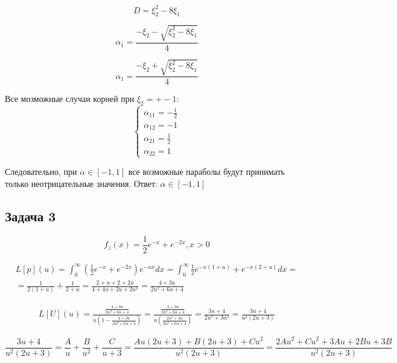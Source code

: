 \documentclass[a4paper,12pt]{article}
\begin{document}
\[ D = \xi_2^2 - 8\xi_1 \]

\[ \alpha_1 = \frac{-\xi_2 - \sqrt{\xi_2^2 - 8\xi_1}}{4} \]

\[ \alpha_1 = \frac{-\xi_2 + \sqrt{\xi_2^2 - 8\xi_1}}{4} \]


Все мозможные случаи корней при $ \xi_2 = +- 1 $:
\[ 
\begin{cases}
	\alpha_{11} = -\frac{1}{2}\\
	\alpha_{12} = -1\\
	\alpha_{21} = \frac{1}{2}\\
	\alpha_{22} = 1
\end{cases}
 \]

Следовательно, при $ \alpha \in [-1, 1] $ все возможные параболы будут принимать только неотрицательные значения.
Ответ:  $ \alpha \in [-1, 1] $ 

\subsection{Задача 3}

\[  f _ { z } ( x ) = \frac { 1 } { 2 } e ^ { - x } + e ^ { - 2 x } , x > 0  \]

\begin{equation}
\begin{aligned}  L [ p ] ( u ) = \int _ { 0 } ^ { \infty } \left( \frac { 1 } { 2 } e ^ { - x } + e ^ { - 2 x } \right) e ^ { - u x } d x  = \int _ { 0 } ^ { \infty } \frac { 1 } { 2 } e ^ { - x ( 1 + u ) } + e ^ { - x ( 2 + u ) } d x = \\ = \frac { 1 } { 2 ( 1 + u ) } + \frac { 1 } { 2 + u } = \frac { 2 + u + 2 + 2 u } { 4 + 4 u + 2 u + 2 u ^ { 2 } } =  \frac { 4 + 3 u } { 2 u ^ { 2 } + 6 u + 4 } \end{aligned}
\end{equation}

\begin{equation}
\begin{aligned}
L [ U ] ( u ) = \frac { \frac { 4 + 3 u } { 2 u ^ { 2 } + 6 u + 4 } } { u \left( 1 - \frac { 4 + 3 u } { 2 u ^ { 2 } + 6 u + 4 } \right) } = \frac { \frac { 4 + 3 u } { 2 u ^ { 2 } + 6 u + 4 } } { u \left( \frac { 2 u ^ { 2 } + 3 u } { 2 u ^ { 2 } + 6 u + 4 } \right) }= \frac { 3 u + 4 } { 2 u ^ { 3 } + 3 u ^ { 2 } } = \frac { 3 u  + 4 } { u ^ { 2 } ( 2 u + 3 ) } 
\end{aligned}
\end{equation}




\[ 
\frac { 3 u + 4 } { u ^ { 2 } ( 2 u + 3 ) } = \frac { A } { u } + \frac { B } { u ^ { 2 } } + \frac { C } { u + 3 }  = \frac { A u ( 2 u + 3 ) + B ( 2 u + 3 ) + C u ^ { 2 } } { u ^ { 2 } ( 2 u + 3 ) } = \frac { 2 A u ^ { 2 } + C u ^ { 2 } + 3 A u + 2 B u + 3 B } { u ^ { 2 } ( 2 u + 3 ) }
 \]
\end{document}
